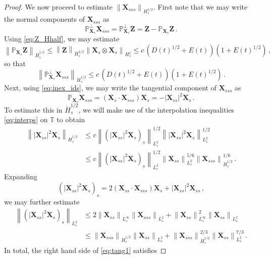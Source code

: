 \documentclass[11pt,reqno]{amsart}
\newcommand{\T}{\mathbb{T}}
\renewcommand{\P}{\mathbb{P}}
\newcommand{\X}{\bm{X}}
\newcommand{\abs}[1]{\left\lvert #1 \right\rvert}
\newcommand{\norm}[1]{\left\lVert #1 \right\rVert}
\numberwithin{equation}{section}
\theoremstyle{definition}
\begin{document}
\begin{proof}
We now proceed to estimate $\norm{\X_{sss}}_{H^{1/2}_s}$. First note that we may write the normal components of $\X_{sss}$ as
\begin{equation}
  \P_{\X_s}^\perp \X_{sss} = \P_{\X_s}^\perp \bm{Z} = \bm{Z} - \P_{\X_s}\bm{Z}\,.
\end{equation}
Using \eqref{eq:Z_Hhalf}, we may estimate
\begin{equation}
  \norm{\P_{\X_s}\bm{Z}}_{\dot H^{1/2}_s} \le \norm{\bm{Z}}_{H^{1/2}_s}\norm{\X_s\otimes\X_s}_{H^1_s}
  \le c\,(D(t)^{1/2}+E(t))(1+E(t)^{1/2}) \,,
\end{equation}
so that
\begin{equation}\label{eq:normal_est}
  \norm{\P_{\X_s}^\perp \X_{sss}}_{\dot H^{1/2}_s} \le c\,(D(t)^{1/2}+E(t))(1+E(t)^{1/2})\,.
\end{equation}
%
%
Next, using \eqref{eq:inex_ids}, we may write the tangential component of $\X_{sss}$ as 
\begin{equation}\label{eq:tang1}
  \P_{\X_s}\X_{sss} = (\X_s\cdot\X_{sss})\X_s =-\abs{\X_{ss}}^2\X_s\,.
\end{equation}
%
%
To estimate this in $\dot H^{1/2}_s$, we will make use of the interpolation inequalities \eqref{eq:interps} on $\T$ to obtain
\begin{equation}
\begin{aligned}
  \norm{\abs{\X_{ss}}^2\X_s}_{\dot H^{1/2}_s} &\le c\norm{(\abs{\X_{ss}}^2\X_s)_s}_{L^2_s}^{1/2}\norm{\abs{\X_{ss}}^2\X_s}_{L^2_s}^{1/2}\\
  &\le c\norm{(\abs{\X_{ss}}^2\X_s)_s}_{L^2_s}^{1/2}\norm{\X_{ss}}_{L^2_s}^{5/6}\norm{\X_{sss}}_{\dot H^{1/2}_s}^{1/6}\,.
\end{aligned}
\end{equation}
Expanding 
\begin{equation}
  (\abs{\X_{ss}}^2\X_s)_s = 2(\X_{ss}\cdot\X_{sss})\X_s+ \abs{\X_{ss}}^2\X_{ss}\,,
\end{equation}
we may further estimate 
\begin{equation}
  \begin{aligned}
  \norm{(\abs{\X_{ss}}^2\X_s)_s}_{L^2_s} &\le 2\norm{\X_{ss}}_{L^\infty_s}\norm{\X_{sss}}_{L^2_s} + \norm{\X_{ss}}_{L^\infty_s}^2\norm{\X_{ss}}_{L^2_s}\\
  &\le \norm{\X_{sss}}_{\dot H^{1/2}_s}\norm{\X_{ss}}_{L^2_s}
  + \norm{\X_{sss}}_{\dot H^{1/2}_s}^{2/3}\norm{\X_{ss}}_{L^2_s}^{7/3}\,.
\end{aligned}
\end{equation}
%
In total, the right hand side of \eqref{eq:tang1} satisfies 

\end{proof}
\end{document}
